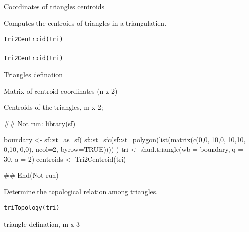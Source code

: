 \documentclass[a4paper]{book}
\begin{document}
%
\begin{Value}
Coordinates of triangles centroids
\end{Value}
%
\begin{Description}\relax
Computes the centroids of triangles in a triangulation.
\end{Description}
%
\begin{Usage}
\begin{verbatim}
Tri2Centroid(tri)

Tri2Centroid(tri)
\end{verbatim}
\end{Usage}
%
\begin{Arguments}
\begin{ldescription}
\item[\code{tri}] Triangles defination
\end{ldescription}
\end{Arguments}
%
\begin{Value}
Matrix of centroid coordinates (n x 2)

Centroids of the triangles, m x 2;
\end{Value}
%
\begin{Examples}
\begin{ExampleCode}
## Not run: 
library(sf)

boundary <- sf::st_as_sf(
  sf::st_sfc(sf::st_polygon(list(matrix(c(0,0, 10,0, 10,10, 0,10, 0,0),
                                         ncol=2, byrow=TRUE))))
)
tri <- shud.triangle(wb = boundary, q = 30, a = 2)
centroids <- Tri2Centroid(tri)

## End(Not run)
\end{ExampleCode}
\end{Examples}
%
\begin{Description}\relax
Determine the topological relation among triangles.
\end{Description}
%
\begin{Usage}
\begin{verbatim}
triTopology(tri)
\end{verbatim}
\end{Usage}
%
\begin{Arguments}
\begin{ldescription}
\item[\code{tri}] triangle defination, m x 3
\end{ldescription}
\end{Arguments}
\end{document}
